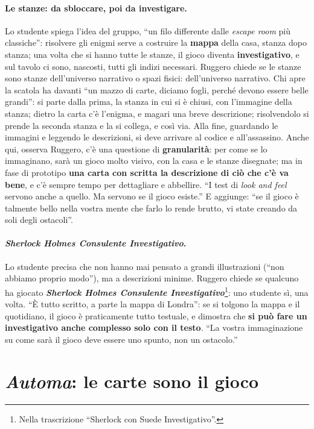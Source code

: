 \paragraph{Le stanze: da sbloccare, poi da investigare.} Lo studente spiega l'idea del
gruppo, ``un filo differente dalle \emph{escape room} più classiche'': risolvere gli enigmi
serve a costruire la \textbf{mappa} della casa, stanza dopo stanza; una volta che si hanno
tutte le stanze, il gioco diventa \textbf{investigativo}, e sul tavolo ci sono, nascosti,
tutti gli indizi necessari. Ruggero chiede se le stanze sono stanze dell'universo narrativo
o spazi fisici: dell'universo narrativo. Chi apre la scatola ha davanti ``un mazzo di carte,
diciamo fogli, perché devono essere belle grandi'': si parte dalla prima, la stanza in cui
si è chiusi, con l'immagine della stanza; dietro la carta c'è l'enigma, e magari una breve
descrizione; risolvendolo si prende la seconda stanza e la si collega, e così via. Alla
fine, guardando le immagini e leggendo le descrizioni, si deve arrivare al codice e
all'assassino. Anche qui, osserva Ruggero, c'è una questione di \textbf{granularità}: per
come se lo immaginano, sarà un gioco molto visivo, con la casa e le stanze disegnate; ma in
fase di prototipo \textbf{una carta con scritta la descrizione di ciò che c'è va bene}, e
c'è sempre tempo per dettagliare e abbellire. ``I test di \emph{look and feel} servono
anche a quello. Ma servono se il gioco esiste.'' E aggiunge: ``se il gioco è talmente bello
nella vostra mente che farlo lo rende brutto, vi state creando da soli degli ostacoli''.

\paragraph{\emph{Sherlock Holmes Consulente Investigativo}.} Lo studente precisa che non
hanno mai pensato a grandi illustrazioni (``non abbiamo proprio modo''), ma a descrizioni
minime. Ruggero chiede se qualcuno ha giocato \textbf{\emph{Sherlock Holmes Consulente
Investigativo}}\footnote{Nella trascrizione ``Sherlock con Suede Investigativo''.}: uno
studente sì, una volta. ``È tutto scritto, a parte la mappa di Londra'': se si tolgono la
mappa e il quotidiano, il gioco è praticamente tutto testuale, e dimostra che \textbf{si
può fare un investigativo anche complesso solo con il testo}. ``La vostra immaginazione su
come sarà il gioco deve essere uno spunto, non un ostacolo.''

\section{\emph{Automa}: le carte sono il gioco}
\label{a12:sec:automa}


